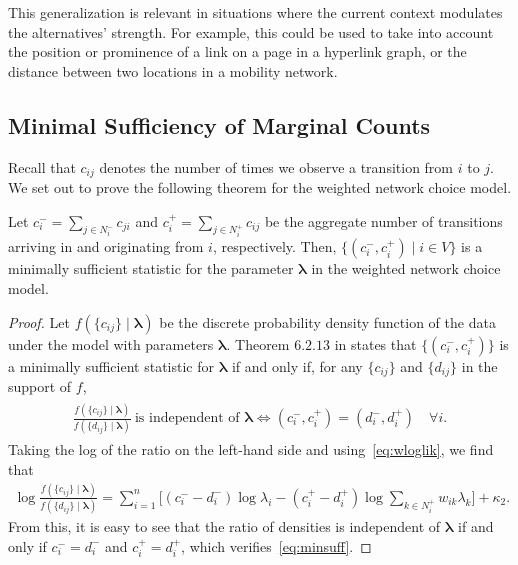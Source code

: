 This generalization is relevant in situations where the current context modulates the alternatives' strength.
For example, this could be used to take into account the position or prominence of a link on a page in a hyperlink graph, or the distance between two locations in a mobility network.


\subsection{Minimal Sufficiency of Marginal Counts}

Recall that $c_{ij}$ denotes the number of times we observe a transition from $i$ to $j$.
We set out to prove the following theorem for the weighted network choice model.

\begin{theorem}
Let $c^-_i = \sum_{j \in N^-_i} c_{ji}$ and $c^+_i = \sum_{j \in N^+_i} c_{ij}$ be the aggregate number of transitions arriving in and originating from $i$, respectively.
Then, $\{ (c^-_i, c^+_i) \mid i \in V \}$ is a minimally sufficient statistic for the parameter $\bm{\lambda}$ in the weighted network choice model.
\end{theorem}

\begin{proof}
Let $f(\{ c_{ij} \} \mid \bm{\lambda})$ be the discrete probability density function of the data under the model with parameters $\bm{\lambda}$.
Theorem $6.2.13$ in \citet{casella2002statistical} states that $\{ (c^-_i, c^+_i) \}$ is a minimally sufficient statistic for $\bm{\lambda}$ if and only if, for any $\{ c_{ij} \}$ and $\{ d_{ij} \}$ in the support of $f$,
\begin{align}
\label{eq:minsuff}
\begin{aligned}
\frac{ f(\{ c_{ij} \} \mid \bm{\lambda}) }{ f(\{ d_{ij} \} \mid \bm{\lambda}) }\ \text{is independent of $\bm{\lambda}$}
\iff (c^-_i, c^+_i) = (d^-_i, d^+_i) \quad \forall i.
\end{aligned}
\end{align}
Taking the log of the ratio on the left-hand side and using~\eqref{eq:wloglik}, we find that
\begin{align*}
\log \frac{ f(\{ c_{ij} \} \mid \bm{\lambda}) }{ f(\{ d_{ij} \} \mid \bm{\lambda}) } =
  \sum_{i = 1}^n \bigg[ (c^-_i\!-\!d^-_i) \log \lambda_i
                       - (c^+_i\!-\!d^+_i) \log\!\sum_{k \in N^+_i}\!w_{ik} \lambda_k \bigg] + \kappa_2.
\end{align*}
From this, it is easy to see that the ratio of densities is independent of $\bm{\lambda}$ if and only if $c^-_i = d^-_i$ and $c^+_i = d^+_i$, which verifies~\eqref{eq:minsuff}.
\end{proof}

